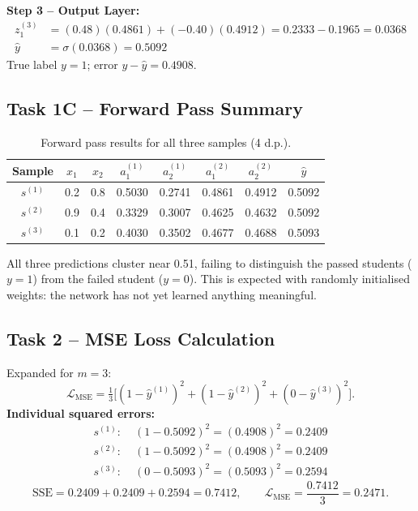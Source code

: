 \documentclass[runningheads]{llncs}
\begin{document}
\noindent\textbf{Step 3 -- Output Layer:}
\begin{align*}
  z_1^{(3)} &= (0.48)(0.4861)+(-0.40)(0.4912) = 0.2333-0.1965 = 0.0368\\
  \hat{y}   &= \sigma(0.0368) = 0.5092
\end{align*}
True label $y=1$; error $y-\hat{y} = 0.4908$.

\subsection{Task 1C -- Forward Pass Summary}

\begin{table}[h]
\centering
\caption{Forward pass results for all three samples (4 d.p.).}
\label{tab:forward}
\begin{tabular}{cccccccc}
\toprule
Sample & $x_1$ & $x_2$ & $a_1^{(1)}$ & $a_2^{(1)}$ &
$a_1^{(2)}$ & $a_2^{(2)}$ & $\hat{y}$\\
\midrule
$s^{(1)}$ & 0.2 & 0.8 & 0.5030 & 0.2741 & 0.4861 & 0.4912 & 0.5092\\
$s^{(2)}$ & 0.9 & 0.4 & 0.3329 & 0.3007 & 0.4625 & 0.4632 & 0.5092\\
$s^{(3)}$ & 0.1 & 0.2 & 0.4030 & 0.3502 & 0.4677 & 0.4688 & 0.5093\\
\bottomrule
\end{tabular}
\end{table}

All three predictions cluster near 0.51, failing to distinguish the passed
students ($y=1$) from the failed student ($y=0$). This is expected with randomly
initialised weights: the network has not yet learned anything meaningful.

\subsection{Task 2 -- MSE Loss Calculation}

Expanded for $m=3$:
\[
  \mathcal{L}_{\text{MSE}} = \tfrac{1}{3}\bigl[(1-\hat{y}^{(1)})^2
  +(1-\hat{y}^{(2)})^2+(0-\hat{y}^{(3)})^2\bigr].
\]
\noindent\textbf{Individual squared errors:}
\begin{align*}
  s^{(1)}: &\; (1-0.5092)^2 = (0.4908)^2 = 0.2409\\
  s^{(2)}: &\; (1-0.5092)^2 = (0.4908)^2 = 0.2409\\
  s^{(3)}: &\; (0-0.5093)^2 = (0.5093)^2 = 0.2594
\end{align*}
\[
  \text{SSE} = 0.2409+0.2409+0.2594 = 0.7412, \qquad
  \mathcal{L}_{\text{MSE}} = \frac{0.7412}{3} = \boxed{0.2471}.
\]
\end{document}
